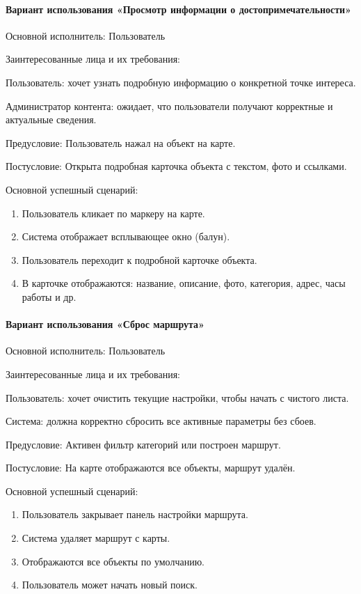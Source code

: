 \paragraph{Вариант использования «Просмотр информации о достопримечательности»}

Основной исполнитель: Пользователь

Заинтересованные лица и их требования:

Пользователь: хочет узнать подробную информацию о конкретной точке интереса.

Администратор контента: ожидает, что пользователи получают корректные и актуальные сведения.

Предусловие: Пользователь нажал на объект на карте.

Постусловие: Открыта подробная карточка объекта с текстом, фото и ссылками.

Основной успешный сценарий:
\begin{enumerate}
	\item Пользователь кликает по маркеру на карте.
	\item Система отображает всплывающее окно (балун).
	\item Пользователь переходит к подробной карточке объекта.
	\item В карточке отображаются: название, описание, фото, категория, адрес, часы работы и др.
\end{enumerate}

\paragraph{Вариант использования «Сброс маршрута»}

Основной исполнитель: Пользователь

Заинтересованные лица и их требования:

Пользователь: хочет очистить текущие настройки, чтобы начать с чистого листа.

Система: должна корректно сбросить все активные параметры без сбоев.

Предусловие: Активен фильтр категорий или построен маршрут.

Постусловие: На карте отображаются все объекты, маршрут удалён.

Основной успешный сценарий:
\begin{enumerate}
	\item Пользователь закрывает панель настройки маршрута.
	\item Система удаляет маршрут с карты.
	\item Отображаются все объекты по умолчанию.
	\item Пользователь может начать новый поиск.
\end{enumerate}

